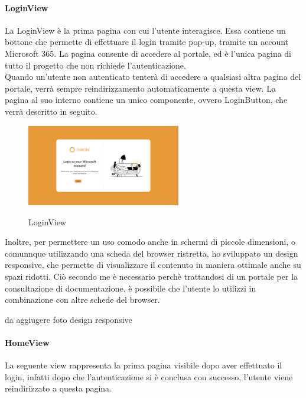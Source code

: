 \paragraph{LoginView}\label{par:ogin-view}
La LoginView è la prima pagina con cui l'utente interagisce. Essa contiene un bottone che permette di effettuare il login tramite pop-up, tramite un account Microsoft 365.
La pagina consente di accedere al portale, ed è l'unica pagina di tutto il progetto che non richiede l'autenticazione.\\
Quando un'utente non autenticato tenterà di accedere a qualsiasi altra pagina del portale, verrà sempre reindirizzamento
automaticamente a questa view.
La pagina al suo interno contiene un unico componente, ovvero LoginButton, che verrà descritto in seguito.
\begin{figure}[ht]
  \centering
  \includegraphics[width=0.6\textwidth, alt={Pagina di login dell'applicazione}]{images/frontend/LoginView.jpg}
  \caption{LoginView}\label{fig:login-view}
\end{figure}
Inoltre, per permettere un uso comodo anche in schermi di piccole dimensioni, o comunnque utilizzando una scheda del browser ristretta, ho sviluppato
un design responsive, che permette di visualizzare il contenuto in maniera ottimale anche su spazi ridotti. 
Ciò secondo me è necessario perchè trattandosi di un portale per la consultazione di documentazione, è possibile che l'utente 
lo utilizzi in combinazione con altre schede del browser.



da aggiugere foto design responsive


\paragraph{HomeView}\label{par:home-view}
La seguente view rappresenta la prima pagina visibile dopo aver effettuato il login, infatti dopo che l'autenticazione si è conclusa con successo, 
l'utente viene reindirizzato a questa pagina.


